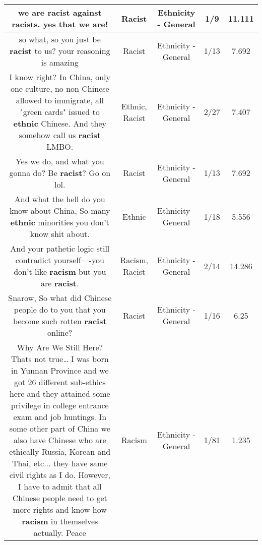 \documentclass[11pt]{article}
\newlength\mylength
\begin{document}
\begin{center}
\begin{longtable}{|C{.65\mylength}|C{.30\mylength}|C{.12\mylength}|C{.12\mylength}|C{.12\mylength}|}
  \small we are \textbf{racist} against racists. yes that we are!\normalsize   & Racist & Ethnicity - General & 1/9 & 11.111 \\  \hline
  \small so what, so you just be \textbf{racist} to us? your reasoning is amazing\normalsize   & Racist & Ethnicity - General & 1/13 & 7.692 \\  \hline
  \small I know right? In China, only one culture, no non-Chinese allowed to immigrate, all "green cards" issued to \textbf{ethnic} Chinese. And they somehow call us \textbf{racist} LMBO.\normalsize   & Ethnic, Racist & Ethnicity - General & 2/27 & 7.407 \\  \hline
  \small Yes we do, and what you gonna do? Be \textbf{racist}? Go on lol.\normalsize   & Racist & Ethnicity - General & 1/13 & 7.692 \\  \hline
  \small And what the hell do you know about China, So many \textbf{ethnic} minorities you don't know shit about.\normalsize   & Ethnic & Ethnicity - General & 1/18 & 5.556 \\  \hline
  \small And your pathetic logic still contradict yourself----you don't like \textbf{racism} but you are \textbf{racist}.\normalsize   & Racism, Racist & Ethnicity - General & 2/14 & 14.286 \\  \hline
  \small Snarow, So what did Chinese people do to you that you become such rotten \textbf{racist} online?\normalsize   & Racist & Ethnicity - General & 1/16 & 6.25 \\  \hline
  \small Why Are We Still Here? Thats not true… I was born in Yunnan Province and we got 26 different sub-ethics here and they attained some privilege in college entrance exam and job huntings. In some other part of China we also have Chinese who are ethically Russia, Korean and Thai, etc... they have same civil rights as I do. However, I have to admit that all Chinese people need to get more rights and know how \textbf{racism} in themselves actually. Peace\normalsize   & Racism & Ethnicity - General & 1/81 & 1.235 \\  \hline

\end{longtable}
\end{center}
\end{document}
